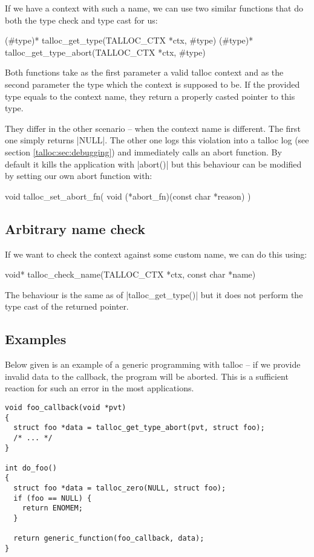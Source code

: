 If we have a context with such a name, we can use two similar functions that do
both the type check and type cast for us:

\begin{funcproto}
(#type)* talloc_get_type(TALLOC_CTX *ctx, #type)
(#type)* talloc_get_type_abort(TALLOC_CTX *ctx, #type)
\end{funcproto}
\funclistend
Both functions take as the first parameter a valid talloc context and as the
second parameter the type which the context is supposed to be. If the provided
type equals to the context name, they return a properly casted pointer to
this type.

They differ in the other scenario -- when the context name is different. The
first one simply returns |NULL|. The other one logs this violation into a talloc
log (see section \ref{talloc:sec:debugging}) and immediately calls an abort
function. By default it kills the application with |abort()| but this behaviour
can be modified by setting our own abort function with:

\begin{funcproto}
void talloc_set_abort_fn(
  void (*abort_fn)(const char *reason)
)
\end{funcproto}

\subsection{Arbitrary name check}

If we want to check the context against some custom name, we can do this using:

\begin{funcproto}
void* talloc_check_name(TALLOC_CTX *ctx, const char *name)
\end{funcproto}
\funclistend
The behaviour is the same as of |talloc_get_type()| but it does not perform the
type cast of the returned pointer.

\subsection{Examples}

Below given is an example of a generic programming with talloc -- if we provide
invalid data to the callback, the program will be aborted. This is a sufficient
reaction for such an error in the most applications.

\begin{lstlisting}[caption={Dynamic type system \#1}]
void foo_callback(void *pvt)
{
  struct foo *data = talloc_get_type_abort(pvt, struct foo);
  /* ... */
}

int do_foo()
{
  struct foo *data = talloc_zero(NULL, struct foo);
  if (foo == NULL) {
    return ENOMEM;
  }

  return generic_function(foo_callback, data);
}
\end{lstlisting}

